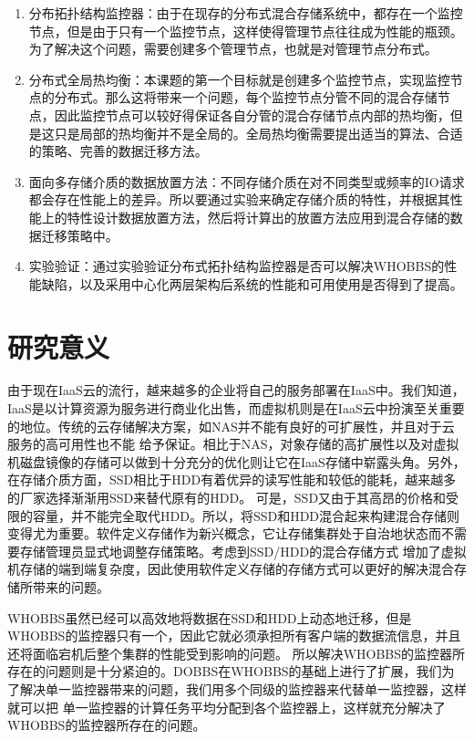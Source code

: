 \begin{enumerate}[noitemsep,topsep=0pt,parsep=0pt,partopsep=0pt]
	\item 分布拓扑结构监控器：由于在现存的分布式混合存储系统中，都存在一个监控节点，但是由于只有一个监控节点，这样使得管理节点往往成为性能的瓶颈。为了解决这个问题，需要创建多个管理节点，也就是对管理节点分布式。
	\item 分布式全局热均衡：本课题的第一个目标就是创建多个监控节点，实现监控节点的分布式。那么这将带来一个问题，每个监控节点分管不同的混合存储节点，因此监控节点可以较好得保证各自分管的混合存储节点内部的热均衡，但是这只是局部的热均衡并不是全局的。全局热均衡需要提出适当的算法、合适的策略、完善的数据迁移方法。	
	\item 面向多存储介质的数据放置方法：不同存储介质在对不同类型或频率的IO请求都会存在性能上的差异。所以要通过实验来确定存储介质的特性，并根据其性能上的特性设计数据放置方法，然后将计算出的放置方法应用到混合存储的数据迁移策略中。
	\item 实验验证：通过实验验证分布式拓扑结构监控器是否可以解决WHOBBS的性能缺陷，以及采用中心化两层架构后系统的性能和可用使用是否得到了提高。
\end{enumerate}

\section{研究意义}
由于现在IaaS云的流行，越来越多的企业将自己的服务部署在IaaS中。我们知道，IaaS是以计算资源为服务进行商业化出售，而虚拟机则是在IaaS云中扮演至关重要的地位。传统的云存储解决方案，如NAS并不能有良好的可扩展性，并且对于云服务的高可用性也不能
给予保证。相比于NAS，对象存储的高扩展性以及对虚拟机磁盘镜像的存储可以做到十分充分的优化则让它在IaaS存储中崭露头角。另外，在存储介质方面，SSD相比于HDD有着优异的读写性能和较低的能耗，越来越多的厂家选择渐渐用SSD来替代原有的HDD。
可是，SSD又由于其高昂的价格和受限的容量，并不能完全取代HDD。所以，将SSD和HDD混合起来构建混合存储则变得尤为重要。软件定义存储作为新兴概念，它让存储集群处于自治地状态而不需要存储管理员显式地调整存储策略。考虑到SSD/HDD的混合存储方式
增加了虚拟机存储的端到端复杂度，因此使用软件定义存储的存储方式可以更好的解决混合存储所带来的问题。

WHOBBS虽然已经可以高效地将数据在SSD和HDD上动态地迁移，但是WHOBBS的监控器只有一个，因此它就必须承担所有客户端的数据流信息，并且还将面临宕机后整个集群的性能受到影响的问题。
所以解决WHOBBS的监控器所存在的问题则是十分紧迫的。DOBBS在WHOBBS的基础上进行了扩展，我们为了解决单一监控器带来的问题，我们用多个同级的监控器来代替单一监控器，这样就可以把
单一监控器的计算任务平均分配到各个监控器上，这样就充分解决了WHOBBS的监控器所存在的问题。


